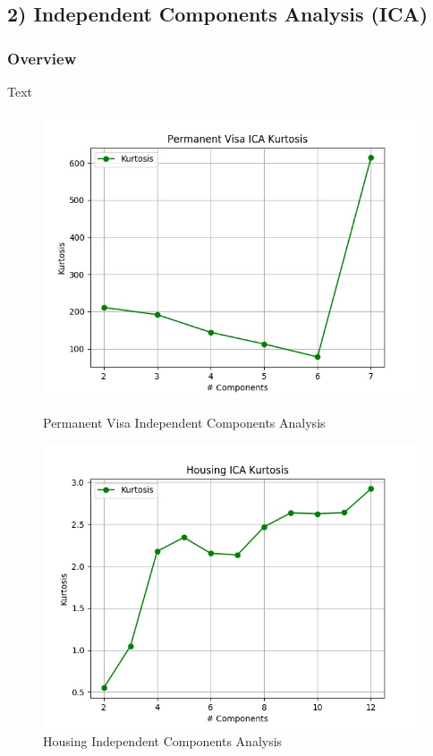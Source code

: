 \documentclass[h]{article}
\begin{document}
\subsection*{2) Independent Components Analysis (ICA)}  
\subsubsection*{Overview}
Text

 \begin{figure}[H]
      \includegraphics[width=1\textwidth,keepaspectratio]{permanent_visa_ica_kurtosis.jpg} 
      \caption*{Permanent Visa Independent Components Analysis } 
   \endminipage\hfill
      \includegraphics[width=1\textwidth,keepaspectratio]{housing_ica_kurtosis.jpg} 
      \caption*{Housing Independent Components Analysis } 
   \endminipage\hfill
\end{figure}
\end{document}
